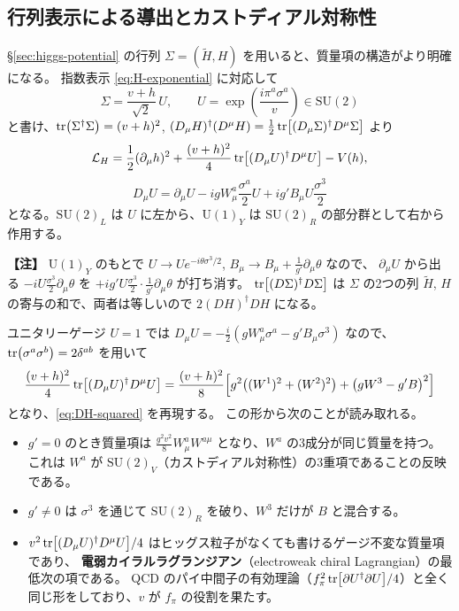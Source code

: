 \documentclass[uplatex,dvipdfmx,a4paper,11pt,openany]{jsbook}
\newcommand{\term}[2]{\textbf{#1}（#2）}
\newenvironment{note}{\vspace{1ex}\par\footnotesize\noindent\textbf{【注】}}{\par\vspace{1ex}}
\numberwithin{equation}{chapter}
\theoremstyle{definition}
\theoremstyle{plain}
\theoremstyle{remark}
\newcommand{\Lag}{\mathcal{L}}
\newcommand{\SU}{\mathrm{SU}}
\newcommand{\U}{\mathrm{U}}
\begin{document}
\subsection{行列表示による導出とカストディアル対称性}
\S\ref{sec:higgs-potential} の行列 $\Sigma=(\tilde H,H)$ を用いると、質量項の構造がより明確になる。
指数表示 \eqref{eq:H-exponential} に対応して
\begin{equation}
\Sigma=\frac{v+h}{\sqrt2}\,U,\qquad U=\exp\!\left(\frac{i\pi^a\sigma^a}{v}\right)\in\SU(2)
\end{equation}
と書け、$\tr(\Sigma^\dagger\Sigma)=(v+h)^2$, $(D_\mu H)^\dagger(D^\mu H)=\frac12\tr\bigl[(D_\mu\Sigma)^\dagger D^\mu\Sigma\bigr]$ より
\begin{equation}
\Lag_H=\frac12(\partial_\mu h)^2+\frac{(v+h)^2}{4}\tr\bigl[(D_\mu U)^\dagger D^\mu U\bigr]-V(h),
\label{eq:EW-chiral-L}
\end{equation}
\begin{equation}
D_\mu U=\partial_\mu U-igW^a_\mu\frac{\sigma^a}{2}U+ig'B_\mu U\frac{\sigma^3}{2}
\end{equation}
となる。$\SU(2)_L$ は $U$ に左から、$\U(1)_Y$ は $\SU(2)_R$ の部分群として右から作用する。
\begin{note}
$\U(1)_Y$ のもとで $U\to Ue^{-i\theta\sigma^3/2}$, $B_\mu\to B_\mu+\frac{1}{g'}\partial_\mu\theta$ なので、
$\partial_\mu U$ から出る $-iU\frac{\sigma^3}{2}\partial_\mu\theta$ を $+ig'U\frac{\sigma^3}{2}\cdot\frac{1}{g'}\partial_\mu\theta$ が打ち消す。
$\tr[(D\Sigma)^\dagger D\Sigma]$ は $\Sigma$ の2つの列 $\tilde H$, $H$ の寄与の和で、両者は等しいので $2(DH)^\dagger DH$ になる。
\end{note}
ユニタリーゲージ $U=1$ では $D_\mu U=-\frac i2\left(gW^a_\mu\sigma^a-g'B_\mu\sigma^3\right)$ なので、
$\tr(\sigma^a\sigma^b)=2\delta^{ab}$ を用いて
\begin{equation}
\frac{(v+h)^2}{4}\tr\bigl[(D_\mu U)^\dagger D^\mu U\bigr]
=\frac{(v+h)^2}{8}\Bigl[g^2\bigl((W^1)^2+(W^2)^2\bigr)+\bigl(gW^3-g'B\bigr)^2\Bigr]
\end{equation}
となり、\eqref{eq:DH-squared} を再現する。
この形から次のことが読み取れる。
\begin{itemize}
    \item $g'=0$ のとき質量項は $\frac{g^2v^2}{8}W^a_\mu W^{a\mu}$ となり、$W^a$ の3成分が同じ質量を持つ。
    これは $W^a$ が $\SU(2)_V$（カストディアル対称性）の3重項であることの反映である。
    \item $g'\ne0$ は $\sigma^3$ を通じて $\SU(2)_R$ を破り、$W^3$ だけが $B$ と混合する。
    \item $v^2\tr[(D_\mu U)^\dagger D^\mu U]/4$ はヒッグス粒子がなくても書けるゲージ不変な質量項であり、
    \term{電弱カイラルラグランジアン}{electroweak chiral Lagrangian}の最低次の項である。
    QCD のパイ中間子の有効理論（$f_\pi^2\tr[\partial U^\dagger\partial U]/4$）と全く同じ形をしており、$v$ が $f_\pi$ の役割を果たす。
\end{itemize}
\end{document}

